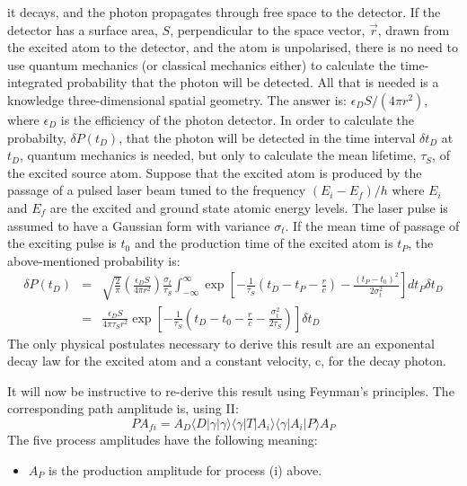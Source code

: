 \documentclass [12pt]{article}
\begin{document}
{     it decays, and the photon propagates through free space to the detector. If the detector
     has a surface area, $S$, perpendicular to the  space vector, $\vec{r}$, drawn from the 
     excited atom to the detector, and the atom is unpolarised, there is no need to 
     use quantum mechanics (or classical mechanics either) to calculate the time-integrated
     probability that the photon will be detected. All that is needed is a knowledge
   three-dimensional spatial geometry. The answer is: $\epsilon_D S/(4 \pi r^2)$, where 
   $\epsilon_D$ is the efficiency of the photon detector. In order to calculate the 
   probabilty, $ \delta P(t_D)$, that the photon will be detected in the time
      interval $\delta t_D$ at $t_D$,
    quantum mechanics is needed, but only to calculate the mean lifetime, $\tau_S$, of the
    excited source atom. Suppose that the excited atom is produced by the passage
   of a pulsed laser beam tuned to the frequency $(E_i-E_f)/h$ where $E_i$ and $E_f$ are the
    excited and ground state atomic energy levels. The laser pulse is assumed to have a
     Gaussian form with variance $\sigma_t$. If the mean time of passage of the exciting
    pulse is $t_0$ and the production time of the excited atom is $t_P$, the above-mentioned probability is: 
 \begin{eqnarray}
  \delta P(t_D) & = & \sqrt{\frac{2}{\pi}}\left( \frac{\epsilon_D S}{4 \pi r^2}\right)
    \frac{\sigma_t}{\tau_S}\int_{-\infty}^{\infty} 
    \exp\left[-\frac{1}{\tau_S}(t_D-t_P-\frac{r}{c}) - \frac{(t_P-t_0)^2}{2\sigma_t^2}\right]
     dt_P \delta t_D  \nonumber \\
    & = & \frac{\epsilon_D S}{4 \pi \tau_S r^2}
     \exp\left[-\frac{1}{\tau_S}(t_D -t_0-\frac{r}{c}-\frac{\sigma_t^2}{2\tau_S})\right]
       \delta t_D 
  \end{eqnarray}
   The only physical postulates necessary to derive this result are an exponental decay law
   for the excited atom and a constant velocity, c, for the decay photon.
   \par It will now be instructive to re-derive this result using Feynman's principles.
    The corresponding path amplitude is, using II:
  \begin{equation}
    PA_{fi} = A_D \langle D|\gamma|\gamma\rangle\langle\gamma|T|A_i\rangle\langle\gamma|A_i|P\rangle A_P
   \end{equation}
    The five process amplitudes have the following meaning:
    \begin{itemize}
   \item $A_P$ is the production amplitude for process (i) above.

\end{itemize}}
\end{document}
